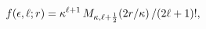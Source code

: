 \[\mathop{f\/}\nolimits\!\left(\epsilon,\ell;r\right)=\kappa^{\ell+1}\mathop{M_{%
\kappa,\ell+\frac{1}{2}}\/}\nolimits\!\left(2r/\kappa\right)/(2\ell+1)!,\]